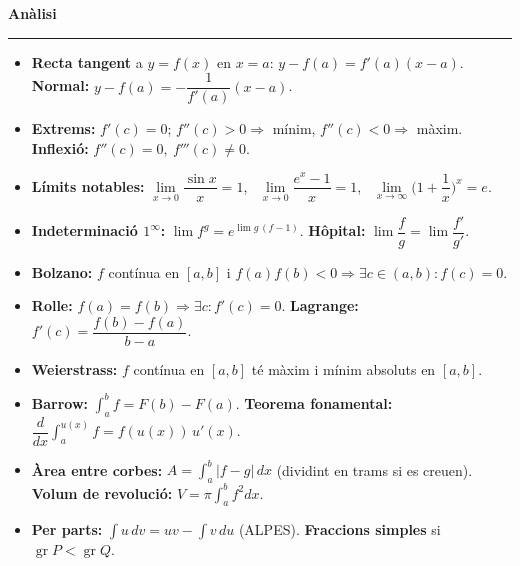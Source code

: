 \normalsize\renewcommand{\arraystretch}{1.6}
\newcommand{\bx}[2]{\begin{minipage}[t]{\linewidth}{\large\bfseries #1}\par\vspace{3pt}\hrule\vspace{4pt}\begin{itemize}\setlength{\itemsep}{3pt}#2\end{itemize}\end{minipage}}
\bx{Anàlisi}{
\item \textbf{Recta tangent} a $y=f(x)$ en $x=a$: $y-f(a)=f'(a)(x-a)$. \textbf{Normal:} $y-f(a)=-\dfrac{1}{f'(a)}(x-a)$.
\item \textbf{Extrems:} $f'(c)=0$; $f''(c)>0\Rightarrow$ mínim, $f''(c)<0\Rightarrow$ màxim. \textbf{Inflexió:} $f''(c)=0,\ f'''(c)\ne0$.
\item \textbf{Límits notables:} $\lim\limits_{x\to0}\dfrac{\sin x}{x}=1$, \ $\lim\limits_{x\to0}\dfrac{e^x-1}{x}=1$, \ $\lim\limits_{x\to\infty}\bigl(1+\dfrac1x\bigr)^{x}=e$.
\item \textbf{Indeterminació $1^\infty$:} $\lim f^{g}=e^{\lim g\,(f-1)}$. \textbf{Hôpital:} $\lim\dfrac fg=\lim\dfrac{f'}{g'}$.
\item \textbf{Bolzano:} $f$ contínua en $[a,b]$ i $f(a)f(b)<0\Rightarrow\exists c\in(a,b):f(c)=0$.
\item \textbf{Rolle:} $f(a)=f(b)\Rightarrow\exists c:f'(c)=0$. \textbf{Lagrange:} $f'(c)=\dfrac{f(b)-f(a)}{b-a}$.
\item \textbf{Weierstrass:} $f$ contínua en $[a,b]$ té màxim i mínim absoluts en $[a,b]$.
\item \textbf{Barrow:} $\int_a^b f=F(b)-F(a)$. \textbf{Teorema fonamental:} $\dfrac{d}{dx}\int_a^{u(x)}f=f(u(x))\,u'(x)$.
\item \textbf{Àrea entre corbes:} $A=\int_a^b|f-g|\,dx$ (dividint en trams si es creuen). \textbf{Volum de revolució:} $V=\pi\int_a^b f^{2}dx$.
\item \textbf{Per parts:} $\int u\,dv=uv-\int v\,du$ (ALPES). \textbf{Fraccions simples} si $\operatorname{gr}P<\operatorname{gr}Q$.}
\newpage
